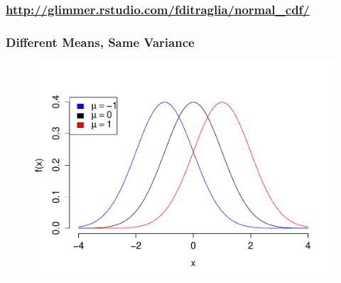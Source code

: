 \documentclass[handout]{beamer}
\begin{document}

\begin{frame}
	\frametitle{\href{http://glimmer.rstudio.com/fditraglia/normal_cdf/}{http://glimmer.rstudio.com/fditraglia/normal\_cdf/}}

\begin{figure}
\end{figure}

\end{frame}





\begin{frame}
\frametitle{Different Means, Same Variance}

\begin{figure}
\includegraphics[scale = 0.65]{./images/normal_means}
\end{figure}
\end{frame}
\end{document}
